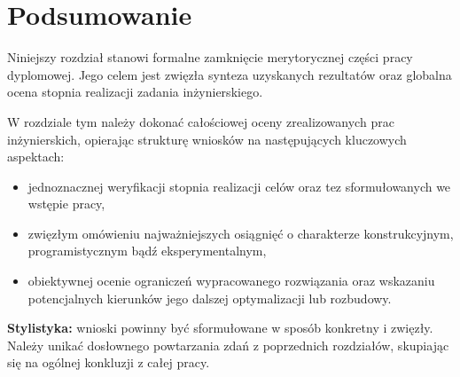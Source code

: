 
\chapter{Podsumowanie}
\label{ch:podsumowanie} %

Niniejszy rozdział stanowi formalne zamknięcie merytorycznej części pracy dyplomowej. Jego celem jest zwięzła synteza uzyskanych rezultatów oraz globalna ocena stopnia realizacji zadania inżynierskiego.

W rozdziale tym należy dokonać całościowej oceny zrealizowanych prac inżynierskich, opierając strukturę wniosków na następujących kluczowych aspektach:
\begin{itemize}
	\item jednoznacznej weryfikacji stopnia realizacji celów oraz tez sformułowanych we wstępie pracy,
	
	\item zwięzłym omówieniu najważniejszych osiągnięć o charakterze konstrukcyjnym, programistycznym bądź eksperymentalnym,
	
	\item obiektywnej ocenie ograniczeń wypracowanego rozwiązania oraz wskazaniu potencjalnych kierunków jego dalszej optymalizacji lub rozbudowy.
\end{itemize}
\noindent \textbf{Stylistyka:} wnioski powinny być sformułowane w sposób konkretny i zwięzły. Należy unikać dosłownego powtarzania zdań z poprzednich rozdziałów, skupiając się na ogólnej konkluzji z całej pracy.

\vspace{0.5cm}

